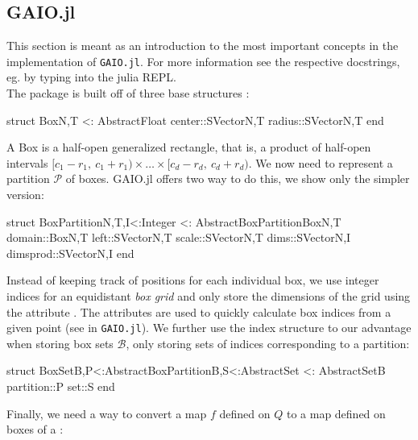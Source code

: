 \subsection{GAIO.jl}

This section is meant as an introduction to the most important concepts in the implementation of 
\texttt{GAIO.jl}. For more information see the respective docstrings, eg. by typing 
 into the julia REPL.\\

The package is built off of three base structures :

\begin{jllisting}[language=julia, style=jlcodestyle]
    struct Box{N,T <: AbstractFloat}
        center::SVector{N,T}
        radius::SVector{N,T}
    end
\end{jllisting}

A Box is a half-open generalized rectangle, that is, a product of half-open intervals
$[c_1 - r_1,\ c_1 + r_1) \times \ldots \times [c_d - r_d,\ c_d + r_d)$. We now 
need to represent a partition $\mathcal{P}$ of boxes. GAIO.jl offers two way to do this, 
we show only the simpler version: 

\begin{jllisting}[language=julia, style=jlcodestyle]
    struct BoxPartition{N,T,I<:Integer} <: AbstractBoxPartition{Box{N,T}}
        domain::Box{N,T}
        left::SVector{N,T}
        scale::SVector{N,T}
        dims::SVector{N,I}
        dimsprod::SVector{N,I}
    end
\end{jllisting}

Instead of keeping track of positions for each individual box, we use integer indices 
for an equidistant \emph{box grid} and only store the dimensions of the grid using 
the attribute . The attributes  are used to 
quickly calculate box indices from a given point (see  
in \texttt{GAIO.jl}). We further use the index structure to our advantage when storing 
box sets $\mathcal{B}$, only storing sets of indices corresponding to a partition:

\begin{jllisting}[language=julia, style=jlcodestyle]
    struct BoxSet{B,P<:AbstractBoxPartition{B},S<:AbstractSet} <: AbstractSet{B}
        partition::P
        set::S
    end
\end{jllisting}

Finally, we need a way to convert a map $f$ defined on $Q$ to a map  defined on 
boxes of a :


